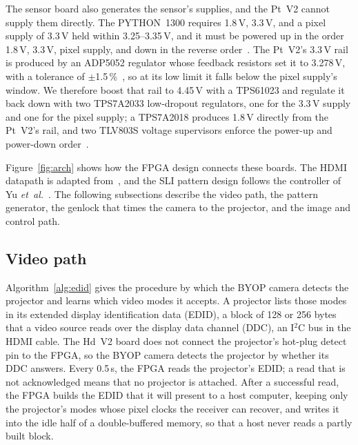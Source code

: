 \documentclass[10pt,journal,compsoc]{IEEEtran}
\newcommand{\SI}[2]{#1\,#2}
\newcommand{\SIrange}[3]{#1--#2\,#3}
\newcommand{\second}{s}\newcommand{\hertz}{Hz}\newcommand{\metre}{m}
\newcommand{\percent}{\%}
\begin{document}
The sensor board also generates the sensor's supplies, and the Pt~V2 cannot supply them directly.
The PYTHON~1300 requires \SI{1.8}{V}, \SI{3.3}{V}, and a pixel supply of \SI{3.3}{V} held within
\SIrange{3.25}{3.35}{V}, and it must be powered up in the order \SI{1.8}{V}, \SI{3.3}{V}, pixel
supply, and down in the reverse order~\cite{onsemi_python1300}. The Pt~V2's \SI{3.3}{V} rail is
produced by an ADP5052 regulator whose feedback resistors set it to \SI{3.278}{V}, with a
tolerance of $\pm$\SI{1.5}{\percent}~\cite{alchitry_pt_sch,adi_adp5052}, so at its low limit
it falls below the pixel supply's window. We therefore boost that rail to \SI{4.45}{V} with a
TPS61023 and regulate it back down with two TPS7A2033 low-dropout regulators, one for the
\SI{3.3}{V} supply and one for the pixel supply; a TPS7A2018 produces \SI{1.8}{V} directly from
the Pt~V2's rail, and two TLV803S voltage supervisors enforce the power-up and power-down
order~\cite{ti_tps61023,ti_tps7a20,ti_tlv803s}.

Figure~\ref{fig:arch} shows how the FPGA design connects these boards. The HDMI datapath is
adapted from~\cite{hamsternz}, and the SLI pattern design follows the controller of Yu
\emph{et~al.}~\cite{yu2019dualspie,yu2020dualprojector}. The following
subsections describe the video path, the pattern generator, the genlock that times the camera to
the projector, and the image and control path.

\subsection{Video path}
Algorithm~\ref{alg:edid} gives the procedure by which the BYOP camera detects the projector and
learns which video modes it accepts. A projector lists those modes in its extended display
identification data (EDID), a block of 128 or 256 bytes that a video source reads over the display
data channel (DDC), an I$^2$C bus in the HDMI cable. The Hd~V2 board does not connect the
projector's hot-plug detect pin to the FPGA, so the BYOP camera detects the projector by whether
its DDC answers. Every \SI{0.5}{\second}, the FPGA reads the projector's EDID; a read that is not acknowledged means that
no projector is attached. After a successful read, the FPGA builds the EDID that it will present
to a host computer, keeping only the projector's modes whose pixel clocks the receiver can
recover, and writes it into the idle half of a double-buffered memory, so that a host never reads
a partly built block.
\end{document}
